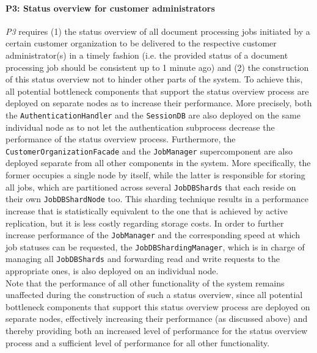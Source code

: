 \documentclass[a4paper,10pt]{article}
\begin{document}
\paragraph{P3\@: Status overview for customer administrators}
\textit{P3} requires (1) the status overview of all document processing jobs initiated by a certain customer organization to be delivered to the respective customer administrator(s) in a timely fashion (i.e. the provided status of a document processing job should be consistent up to 1 minute ago) and (2) the construction of this status overview not to hinder other parts of the system. To achieve this, all potential bottleneck components that support the status overview process are deployed on separate nodes as to increase their performance. More precisely, both the \texttt{AuthenticationHandler} and the \texttt{SessionDB} are also deployed on the same individual node as to not let the authentication subprocess decrease the performance of the status overview process. Furthermore, the \texttt{CustomerOrganizationFacade} and the \texttt{JobManager} supercomponent are also deployed separate from all other components in the system. More specifically, the former occupies a single node by itself, while the latter is responsible for storing all jobs, which are partitioned across several \texttt{JobDBShards} that each reside on their own \texttt{JobDBShardNode} too. This sharding technique results in a performance increase that is statistically equivalent to the one that is achieved by active replication, but it is less costly regarding storage costs. In order to further increase performance of the \texttt{JobManager} and the corresponding speed at which job statuses can be requested, the \texttt{JobDBShardingManager}, which is in charge of managing all \texttt{JobDBShards} and forwarding read and write requests to the appropriate ones, is also deployed on an individual node.\\
Note that the performance of all other functionality of the system remains unaffected during the construction of such a status overview, since all potential bottleneck components that support this status overview process are deployed on separate nodes, effectively increasing their performance (as discussed above) and thereby providing both an increased level of performance for the status overview process and a sufficient level of performance for all other functionality.\\
\end{document}
